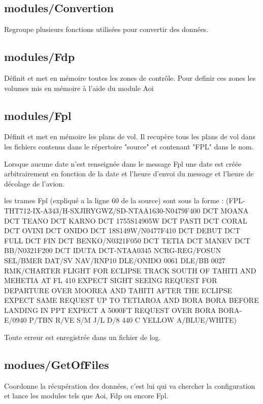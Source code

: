     \subsection{modules/Convertion\label{pyConvertion}} 
Regroupe plusieurs fonctions utilisées pour convertir des données.
\newpage

    \subsection{modules/Fdp\label{pyFdp}}
Définit et met en mémoire toutes les zones de contrôle. Pour definir ces zones les volumes mis en mémoire à l'aide du module Aoi 
\newpage

    \subsection{modules/Fpl\label{pyFpl}}
Définit et met en mémoire les plans de vol. Il recupère tous les plans de vol dans les fichiers contenus dans le répertoire "source" et contenant "FPL" dans le nom.

Lorsque aucune date n'est renseignée dans le message Fpl une date est créée arbitrairement en fonction de la date et l'heure d'envoi du message et l'heure de décolage de l'avion.

les trames Fpl (expliqué a la ligne 60 de la source) sont sous la forme : \newline
(FPL-THT712-IX-A343/H-SXJIRYGWZ/SD-NTAA1630-N0479F400 DCT MOANA DCT TEANO DCT KARNO DCT 1755S14905W DCT PASTI DCT CORAL DCT OVINI DCT ONIDO DCT 18S149W/N0477F410 DCT DEBUT DCT FULL DCT FIN DCT BENKO/N0321F050 DCT TETIA DCT MANEV DCT BB/N0321F200 DCT IDUTA DCT-NTAA0345 NCRG-REG/FOSUN SEL/BMER DAT/SV NAV/RNP10 DLE/ONIDO 0061 DLE/BB 0027 RMK/CHARTER FLIGHT FOR ECLIPSE TRACK SOUTH OF TAHITI AND MEHETIA AT FL 410 EXPECT SIGHT SEEING REQUEST FOR DEPARTURE OVER MOOREA AND TAHITI AFTER THE ECLIPSE EXPECT SAME REQUEST UP TO TETIAROA AND BORA BORA BEFORE LANDING IN PPT EXPECT A 5000FT REQUEST OVER BORA BORA-E/0940 P/TBN R/VE S/M J/L D/8 440 C YELLOW A/BLUE/WHITE)

Toute erreur est enregistrée dans un fichier de log.
\newpage

    \subsection{modues/GetOfFiles\label{pyGOF}} 
Coordonne la récupération des données, c'est lui qui va chercher la configuration et lance les modules tels que Aoi, Fdp ou encore Fpl. 
\newpage

